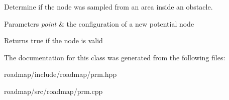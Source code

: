 Determine if the node was sampled from an area inside an obstacle. 


\begin{DoxyParams}{Parameters}
{\em point} & the configuration of a new potential node \\
\hline
\end{DoxyParams}
\begin{DoxyReturn}{Returns}
true if the node is valid 
\end{DoxyReturn}


The documentation for this class was generated from the following files\+:\begin{DoxyCompactItemize}
\item 
roadmap/include/roadmap/prm.\+hpp\item 
roadmap/src/roadmap/prm.\+cpp\end{DoxyCompactItemize}

